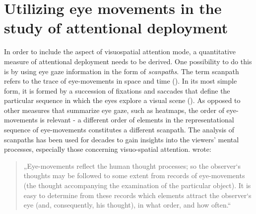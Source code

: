 \documentclass[a4paper, 12pt]{scrreprt}
\begin{document}
\section{Utilizing eye movements in the study of attentional deployment}\label{section:eyeutils}

In order to include the aspect of visuospatial attention mode, a quantitative measure of attentional deployment needs to be derived. One possibility to do this is by using eye gaze information in the form of \textit{scanpaths}.
The term scanpath refers to the trace of eye-movements in space and time (\cite{holmqvist2011eye}). In its most simple form, it is formed by a succession of fixations and saccades that define the particular sequence in which the eyes explore a visual scene (\cite{anderson2015comparison}). As opposed to other measures that summarize eye gaze, such as heatmaps, the order of eye-movements is relevant - a different order of elements in the representational sequence of eye-movements constitutes a different scanpath. \newline
The analysis of scanpaths has been used for decades to gain insights into the viewers’ mental processes, especially those concerning visuo-spatial attention. \textcite{yarbus1967eye} wrote: 

\begin{quotation}
\footnotesize{„Eye-movements reflect the human thought processes; so the observer‘s thoughts may be followed to some extent from records of eye-movements (the thought accompanying the examination of the particular object). It is easy to determine from these records which elements attract the observer‘s eye (and, consequently, his thought), in what order, and how often.“}
\end{quotation}
\end{document}
